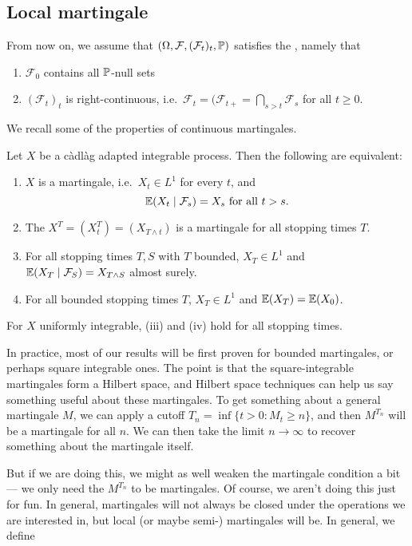 \documentclass[a4paper]{article}
\begin{document}
\subsection{Local martingale}
From now on, we assume that $(\Omega, \mathcal{F}, (\mathcal{F}_t)_t, \P)$ satisfies the , namely that
\begin{enumerate}
  \item $\mathcal{F}_0$ contains all $\P$-null sets
  \item $(\mathcal{F}_t)_t$ is right-continuous, i.e.\ $\mathcal{F}_t = (\mathcal{F}_{t+} = \bigcap_{s > t} \mathcal{F}_s$ for all $t \geq 0$.
\end{enumerate}

We recall some of the properties of continuous martingales.
\begin{thm}
  Let $X$ be a c\`adl\`ag adapted integrable process. Then the following are equivalent:
  \begin{enumerate}
    \item $X$ is a martingale, i.e.\ $X_t \in L^1$ for every $t$, and
      \[
        \E(X_t \mid \mathcal{F}_s) = X_s \text{ for all }t > s.
      \]
    \item The  $X^T = (X^T_t) = (X_{T \wedge t})$ is a martingale for all stopping times $T$.
    \item For all stopping times $T, S$ with $T$ bounded, $X_T \in L^1$ and $\E(X_T \mid \mathcal{F}_S) = X_{T \wedge S}$ almost surely.
    \item For all bounded stopping times $T$, $X_T \in L^1$ and $\E(X_T) = \E(X_0)$.
  \end{enumerate}
  For $X$ uniformly integrable, (iii) and (iv) hold for all stopping times.
\end{thm}

In practice, most of our results will be first proven for bounded martingales, or perhaps square integrable ones. The point is that the square-integrable martingales form a Hilbert space, and Hilbert space techniques can help us say something useful about these martingales. To get something about a general martingale $M$, we can apply a cutoff $T_n = \inf \{t > 0: M_t \geq n\}$, and then $M^{T_n}$ will be a martingale for all $n$. We can then take the limit $n \to \infty$ to recover something about the martingale itself.

But if we are doing this, we might as well weaken the martingale condition a bit --- we only need the $M^{T_n}$ to be martingales. Of course, we aren't doing this just for fun. In general, martingales will not always be closed under the operations we are interested in, but local (or maybe semi-) martingales will be. In general, we define
\end{document}
